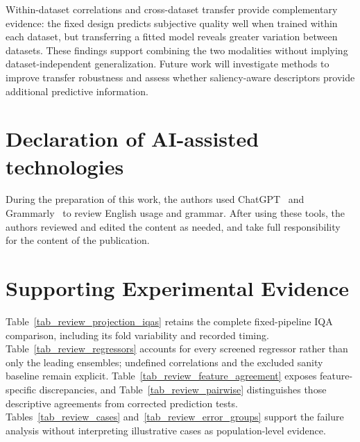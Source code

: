 \documentclass[final,3p,times,twocolumn]{elsarticle}
\begin{document}
Within-dataset correlations and cross-dataset transfer provide complementary evidence: the fixed design predicts subjective quality well when trained within each dataset, but transferring a fitted model reveals greater variation between datasets. These findings support combining the two modalities without implying dataset-independent generalization. Future work will investigate methods to improve transfer robustness and assess whether saliency-aware descriptors provide additional predictive information.



\section*{Declaration of AI-assisted technologies}

During the preparation of this work, the authors used ChatGPT\texttrademark~ and Grammarly\texttrademark~ to review English usage and grammar. After using these tools, the authors reviewed and edited the content as needed, and take full responsibility for the content of the publication.




\appendix
\section{Supporting Experimental Evidence} \label{sec_review_appendix}

Table~\ref{tab_review_projection_iqas} retains the complete fixed-pipeline IQA comparison, including its fold variability and recorded timing. Table~\ref{tab_review_regressors} accounts for every screened regressor rather than only the leading ensembles; undefined correlations and the excluded sanity baseline remain explicit. Table~\ref{tab_review_feature_agreement} exposes feature-specific discrepancies, and Table~\ref{tab_review_pairwise} distinguishes those descriptive agreements from corrected prediction tests. Tables~\ref{tab_review_cases} and~\ref{tab_review_error_groups} support the failure analysis without interpreting illustrative cases as population-level evidence.
\end{document}

